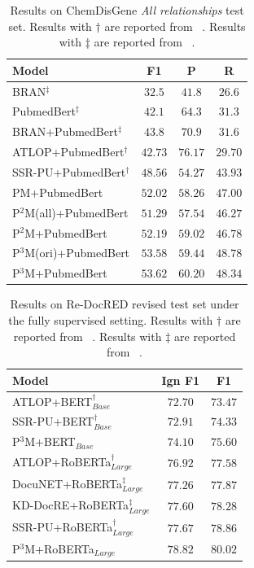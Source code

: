 \documentclass[letterpaper]{article}
\begin{document}
\begin{table}[!ht]
\centering
\begin{tabular}{lccc}
\toprule
\textbf{Model} & F1 & P & R \\
\midrule BRAN$^{\ddagger}$ & $32.5$ & $41.8$ & $26.6$ \\
PubmedBert$^{\ddagger}$ & $42.1$ & $64.3$ & $31.3$ \\
BRAN+PubmedBert$^{\ddagger}$ & $43.8$ & $70.9$ & $31.6$ \\
\midrule
ATLOP+PubmedBert$^{\dagger}$ & $42.73$ & $\mathbf{76.17} $ & $29.70$ \\
SSR-PU+PubmedBert$^{\dagger}$ & $48.56$ & $54.27$ & $43.93$ \\
PM+PubmedBert & $52.02$ & $58.26$ & $47.00$ \\
P$^{2}$M(all)+PubmedBert & $51.29$ & $57.54$ & $46.27$ \\
P$^{2}$M+PubmedBert & $52.19$ & $59.02$ & $46.78$ \\
P$^{3}$M(ori)+PubmedBert & $53.58$ & $59.44$ & $\mathbf{48.78}$ \\
P$^{3}$M+PubmedBert & $\mathbf{53.62}$ & $60.20$ & $48.34$ \\
\bottomrule
\end{tabular}
\caption{
Results on ChemDisGene \emph{All relationships} test set. Results with $\dagger$ are reported from ~\cite{DBLP:conf/emnlp/WangLHZ22}. Results with $\ddagger$ are reported from ~\cite{DBLP:conf/lrec/ZhangMTM22}.
}
\label{tab3}
\end{table}

\begin{table}
\centering
\begin{tabular}{lcc}
\toprule \textbf{Model} & Ign F1 & F1 \\
\midrule ATLOP+BERT$_{Base}^{\dagger}$ & $72.70$ & $73.47$ \\
SSR-PU+BERT$_{Base}^{\dagger}$ & $72.91$ & $74.33$ \\
P$^{3}$M+BERT$_{Base}$ & $\mathbf{74.10}$ & $\mathbf{75.60}$ \\
\midrule ATLOP+RoBERTa$_{Large}^{\dagger}$ & $76.92$ & $77.58$ \\
DocuNET+RoBERTa$_{Large}^{\ddagger}$ & $77.26$ & $77.87$ \\
KD-DocRE+RoBERTa$_{Large}^{\ddagger}$ & $77.60$ & $78.28$ \\
SSR-PU+RoBERTa$_{Large}^{\dagger}$ & $77.67$ & $78.86$ \\
P$^{3}$M+RoBERTa$_{Large}$ & $\mathbf{78.82}$ & $\mathbf{80.02}$ \\
\bottomrule
\end{tabular}
\caption{Results on Re-DocRED revised test set under the fully supervised setting. Results with $\dagger$ are reported from ~\cite{DBLP:conf/emnlp/WangLHZ22}. Results with $\ddagger$ are reported from ~\cite{DBLP:conf/emnlp/Tan0BNA22}.
}
\label{tab4}
\end{table}
\end{document}
